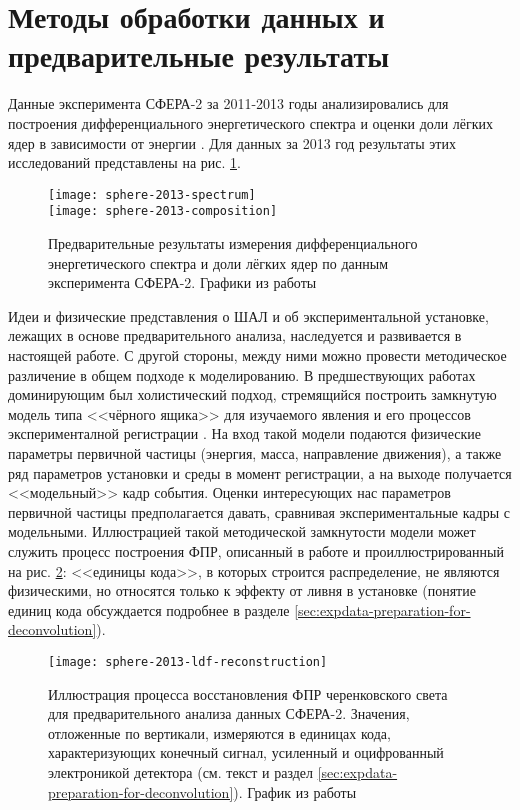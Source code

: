 \section{Методы обработки данных и предварительные результаты}

Данные эксперимента СФЕРА-2 за 2011-2013 годы анализировались для построения дифференциального энергетического спектра и оценки доли лёгких ядер в зависимости от энергии \cite{Antonov2013, Chernov2017-ICRC}. Для данных за 2013 год результаты этих исследований представлены на рис. \ref{pic:sphere-previous-results}.

\begin{figure}
	\centering
	\texttt{[image: sphere-2013-spectrum]}
	\\
	\texttt{[image: sphere-2013-composition]}
	\caption{Предварительные результаты измерения дифференциального энергетического спектра и доли лёгких ядер по данным эксперимента СФЕРА-2. Графики из работы \cite[рис. 8 и рис. 10]{Chernov2017-ICRC}}
	\label{pic:sphere-previous-results}
\end{figure}

Идеи и физические представления о ШАЛ и об экспериментальной установке, лежащих в основе предварительного анализа, наследуется и развивается в настоящей работе. С другой стороны, между ними можно провести методическое различение в общем подходе к моделированию. В предшествующих работах доминирующим был холистический подход, стремящийся построить замкнутую модель типа <<чёрного ящика>> для изучаемого явления и его процессов эксперименталной регистрации \cite{Chernov2015}. На вход такой модели подаются физические параметры первичной частицы (энергия, масса, направление движения), а также ряд параметров установки и среды в момент регистрации, а на выходе получается <<модельный>> кадр события. Оценки интересующих нас параметров первичной частицы предполагается давать, сравнивая экспериментальные кадры с модельными. Иллюстрацией такой методической замкнутости модели может служить процесс построения ФПР, описанный в работе \cite{Sphere2015} и проиллюстрированный на рис. \ref{pic:sphere-previous-ldf}: <<единицы кода>>, в которых строится распределение, не являются физическими, но относятся только к эффекту от ливня в установке (понятие единиц кода обсуждается подробнее в разделе \ref{sec:expdata-preparation-for-deconvolution}).

\begin{figure}
	\centering
	\texttt{[image: sphere-2013-ldf-reconstruction]}
	\caption{Иллюстрация процесса восстановления ФПР черенковского света для предварительного анализа данных СФЕРА-2. Значения, отложенные по вертикали, измеряются в единицах кода, характеризующих конечный сигнал, усиленный и оцифрованный электроникой детектора (см. текст и раздел \ref{sec:expdata-preparation-for-deconvolution}). График из работы \cite[рис. 27]{Sphere2015}}
	\label{pic:sphere-previous-ldf}
\end{figure}

